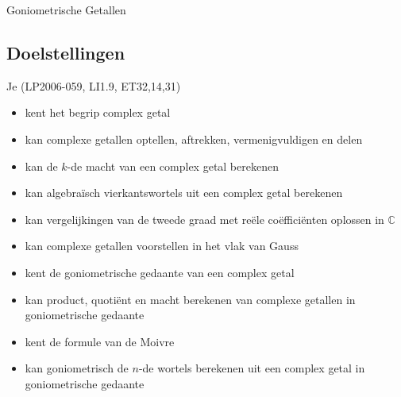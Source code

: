 \documentclass[12pt,twoside]{article}
\begin{document}
\pagestyle{fancy}
\lhead{}

\begin{theorie}

  \thispagestyle{empty}
  \begin{center}
    \begin{mdframed}
      \centering
      \fontsize{40}{60}\selectfont Goniometrische Getallen
    \end{mdframed}
    \vfill
    \vfill
  \end{center}

  \subsection*{Doelstellingen}
  \vspace*{-0.8cm}
  {\singlespacing
    Je \hfill  {\scriptsize(LP2006-059, LI1.9, ET32,14,31)}
    \begin{itemize}
      \itemsep-0.2em
    \item kent het begrip complex getal
    \item kan complexe getallen optellen, aftrekken, vermenigvuldigen en delen
    \item kan de $k$-de macht van een complex getal berekenen
    \item kan algebraïsch vierkantswortels uit een complex getal berekenen
    \item kan vergelijkingen van de tweede graad met reële coëfficiënten oplossen in $\mathbb{C}$
    \item kan complexe getallen voorstellen in het vlak van Gauss
    \item kent de goniometrische gedaante van een complex getal
    \item kan product, quotiënt en macht berekenen van complexe
      getallen in goniometrische gedaante
    \item kent de formule van de Moivre
    \item kan goniometrisch de $n$-de wortels berekenen uit een complex getal in goniometrische gedaante
    \end{itemize}}

  \thispagestyle{empty}
  \mbox{}
  \newpage
  \clearpage
  \thispagestyle{empty}
  \tableofcontents
  \newpage
  \clearpage

  \fancyhead[RE,LO]{}

\end{theorie}
\end{document}
